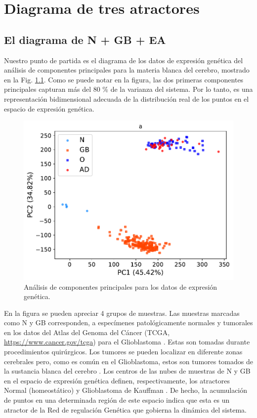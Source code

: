 \chapter{Diagrama de tres atractores}
\label{cap3}
\onehalfspacing


\section{El diagrama de N + GB + EA}\label{sec:ngbad}

Nuestro punto de partida es el diagrama de los datos de expresión genética del análisis de componentes principales para la materia blanca del cerebro, mostrado en la Fig. \ref{fig:fig1a}. Como se puede notar en la figura, las dos primeras componentes principales capturan más del 80 \% de la varianza del sistema. Por lo tanto, es una representación bidimensional adecuada de la distribución real de los puntos en el espacio de expresión genética.

\begin{figure}[!ht]
	\centering
	\includegraphics{figures/Fig_1a.pdf}
	\caption{\label{fig:fig1a}
		Análisis de componentes principales para los datos de expresión genética.}
\end{figure}

En la figura se pueden apreciar 4 grupos de muestras. Las muestras marcadas como N y GB corresponden, a especímenes patológicamente normales y tumorales en los datos del Atlas del Genoma del Cáncer (TCGA, \href{https://www.cancer.gov/tcga}{https://www.cancer.gov/tcga}) para el Glioblastoma \cite{Brennan_2013}. Estas son tomadas durante procedimientos quirúrgicos. Los tumores se pueden localizar en diferente zonas cerebrales pero, como es común en el Glioblastoma, estos son tumores tomados de la sustancia blanca del cerebro \cite{ellingson2013probabilistic}. Los centros de las nubes de muestras de N y GB en el espacio de expresión genética definen, respectivamente, los atractores Normal (homeostático) y Glioblastoma de Kauffman \cite{Huang_2009, Gonzalez_2023}. De hecho, la acumulación de puntos en una determinada región de este espacio indica que esta es un atractor de la Red de regulación Genética que gobierna la dinámica del sistema.

